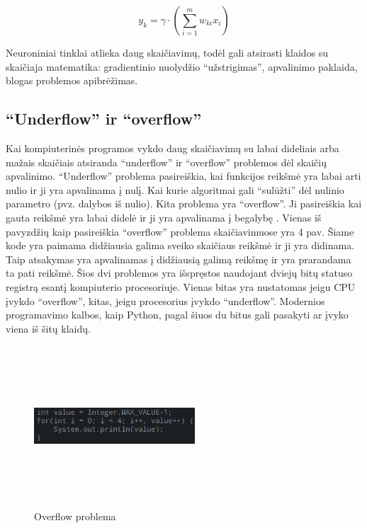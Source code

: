 \documentclass{VUMIFInfKursinis}
\begin{document}
\begin{equation}
  y_{k} = \gamma \cdot (\sum_{i=1}^{m}w_{ki}x_{i})
\end{equation}

Neuroniniai tinklai atlieka daug skaičiavimų, todėl gali atsirasti klaidos su
skaičiaja matematika: gradientinio nuolydžio \enquote{užstrigimas}, apvalinimo paklaida,
blogas problemos apibrėžimas.

\subsection{\enquote{Underflow} ir \enquote{overflow}}
\par
Kai kompiuterinės programos vykdo daug skaičiavimų su
labai dideliais arba mažais skaičiais atsiranda \enquote{underflow} ir \enquote{overflow} problemos
dėl skaičių apvalinimo. \enquote{Underflow} problema pasireiškia,
kai funkcijos reikšmė yra labai arti nulio ir ji yra apvalinama į nulį. Kai
kurie algoritmai gali \enquote{sulūžti} dėl nulinio parametro (pvz. dalybos iš nulio). Kita
problema yra \enquote{overflow}. Ji pasireiškia kai gauta reikšmė yra labai didelė ir ji yra
apvalinama į begalybę \cite{salt7}. Vienas iš pavyzdžių kaip pasireiškia \enquote{overflow} problema skaičiavimuose
yra 4 pav. Šiame kode yra paimama didžiausia galima sveiko skaičiaus reikšmė ir ji
yra didinama. Taip atsakymas yra apvalinamas į didžiausią galimą reikšmę ir
yra prarandama ta pati reikšmė. Šios dvi problemos yra išspręstos naudojant dviejų bitų statuso registrą
esantį kompiuterio procesoriuje. Vienas bitas yra nustatomas jeigu CPU įvykdo \enquote{overflow}, kitas, jeigu
procesorius įvykdo \enquote{underflow}. Modernios programavimo kalbos, kaip Python, pagal šiuos du
bitus gali pasakyti ar įvyko viena iš šitų klaidų.

\begin{figure}[ht]
  \centering
  \includegraphics[width=6cm,height=6cm,keepaspectratio]{code1.png}
  \caption{Overflow problema}
  \label{fig:overflowProblem}
\end{figure}
\end{document}
